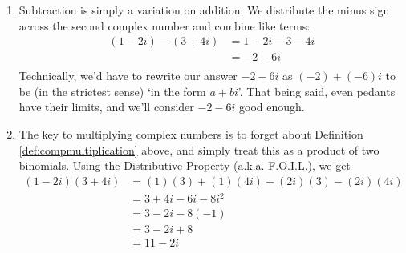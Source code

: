 {
\begin{enumerate}

\item  Subtraction is simply a variation on addition: We distribute the minus sign across the second complex number and combine like terms:
\begin{align*}
 (1-2i) - (3+4i) & =   1-2i-3-4i  \tag*{Distribute} \\
                 & =   -2 - 6i  \tag*{Gather like terms} \\
\end{align*}
Technically, we'd have to rewrite our answer  $-2-6i$ as $(-2) + (-6)i$ to be (in the strictest sense) `in the form $a+bi$'. That being said, even pedants have their limits, and we'll consider $-2-6i$ good enough.

\item  The key to multiplying complex numbers is to forget about Definition \ref{def:compmultiplication} above, and simply treat this as a product of two binomials. Using the Distributive Property (a.k.a. F.O.I.L.), we get
\begin{align*}
  (1-2i)(3+4i)  & =  (1)(3) + (1)(4i) - (2i)(3) - (2i)(4i)  \tag*{F.O.I.L.} \\
	              & =  3+4i-6i-8i^2  \\
								& =  3 - 2i - 8(-1)  \tag*{$i^2=-1$} \\
								& =  3 - 2i + 8  \\
								& =  11 - 2i 
\end{align*}


\end{enumerate}}
